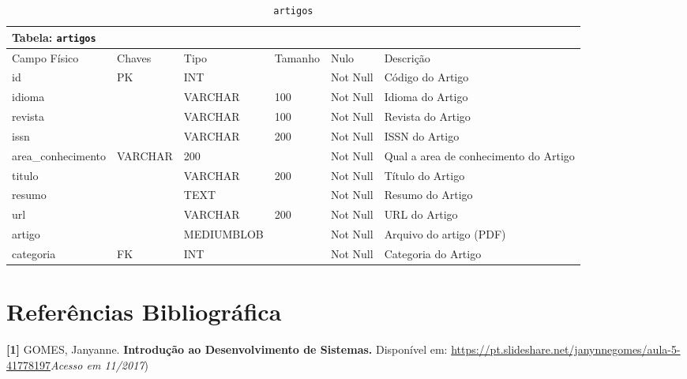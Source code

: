 \documentclass[12pt,a4paper]{article}
\begin{document}
\begin{center}
\begin{table}[h!]
	\caption{\texttt{artigos}}
	\label{tabela:artigos}
	\begin{tabular}{|p{2.3cm}|p{1.2cm}|p{1.8cm}|p{1.5cm}|p{1cm}|p{6cm}|}\hline	
		\multicolumn{6}{|p{16cm}|}{\cellcolor{cinzaClaro}  \centering Tabela: \texttt{artigos}} \\ \hline %
		{\small Campo Físico}   & {\small Chaves} & {\small Tipo} & {\small Tamanho} & {\small Nulo} & {\small Descrição}\\\hline %
		
		{\tiny id} & {\tiny PK} & {\tiny INT} & {\tiny } & {\tiny Not Null} &{\tiny Código do Artigo}\\\hline
		{\tiny idioma} & {\tiny } & {\tiny VARCHAR} & {\tiny 100} & {\tiny Not Null} &{\tiny Idioma do Artigo}\\\hline
		{\tiny revista} & {\tiny } & {\tiny VARCHAR} & {\tiny 100} & {\tiny Not Null} &{\tiny Revista do Artigo}\\\hline
		{\tiny issn} & {\tiny } & {\tiny VARCHAR} & {\tiny 200} & {\tiny Not Null} &{\tiny ISSN do Artigo}\\\hline
		{\tiny area\_conhecimento} & {\tiny VARCHAR} & {\tiny 200} & {\tiny } & {\tiny Not Null} &{\tiny Qual a area de conhecimento do Artigo}\\\hline
		{\tiny titulo} & {\tiny } & {\tiny VARCHAR} & {\tiny 200} & {\tiny Not Null} &{\tiny Título do Artigo}\\\hline
		{\tiny resumo} & {\tiny } & {\tiny TEXT} & {\tiny } & {\tiny Not Null} &{\tiny Resumo do Artigo}\\\hline
		{\tiny url} & {\tiny } & {\tiny VARCHAR} & {\tiny 200} & {\tiny Not Null} &{\tiny URL do Artigo}\\\hline
		{\tiny artigo} & {\tiny } & {\tiny MEDIUMBLOB} & {\tiny } & {\tiny Not Null} &{\tiny Arquivo do artigo (PDF)}\\\hline
		{\tiny categoria} & {\tiny FK} & {\tiny INT} & {\tiny } & {\tiny Not Null} &{\tiny Categoria do Artigo
}\\\hline
			
	\end{tabular}
\end{table}	
\end{center}

\newpage
\section{Referências Bibliográfica}
\noindent \textbf{[1]} GOMES, Janyanne. \textbf{Introdução ao Desenvolvimento de Sistemas.} Disponível em: \url {https://pt.slideshare.net/janynnegomes/aula-5-41778197}\textit{Acesso em 11/2017})\\\vspace{0.2cm}
\end{document}
